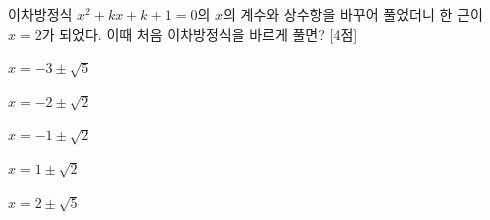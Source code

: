 이차방정식 $x^2+kx+k+1=0$의 $x$의 계수와 상수항을 바꾸어 풀었더니 한 근이 $x=2$가 되었다. 이때 처음 이차방정식을 바르게 풀면?  \mbox{[4점]}
\begin{choices32}{\rule[-3ex]{0pt}{8ex}$x=-3\pm\sqrt{5}$}{\rule[-3ex]{0pt}{8ex}$x=-2\pm\sqrt{2}$}{\rule[-3ex]{0pt}{8ex}$x=-1\pm\sqrt{2}$}{\rule[-3ex]{0pt}{8ex}$x=1\pm\sqrt{2}$}{\rule[-3ex]{0pt}{8ex}$x=2\pm\sqrt{5}$}\end{choices32}
